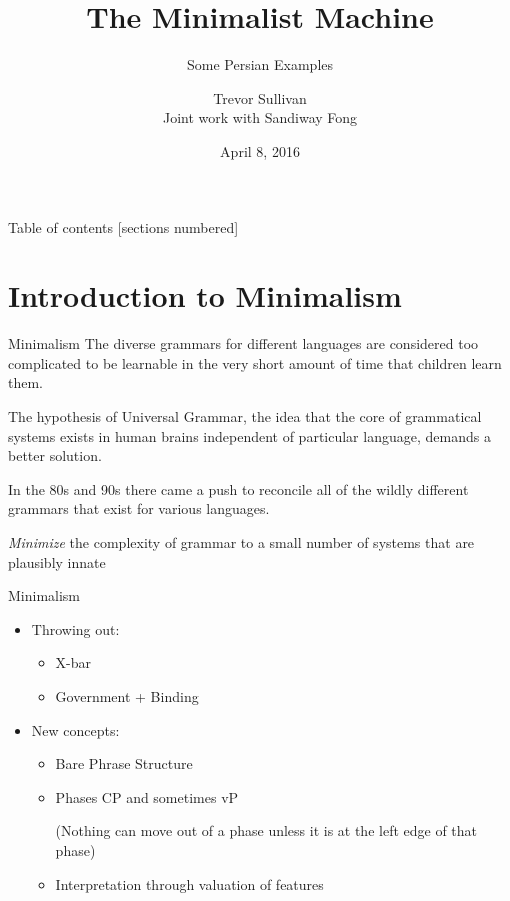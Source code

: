 \documentclass[10pt]{beamer}
\title{The Minimalist Machine}
\subtitle{Some Persian Examples}
\date{April 8, 2016}
\author{Trevor Sullivan \\
Joint work with Sandiway Fong}
\institute{University of Arizona}
\begin{document}
 

\maketitle

\begin{frame}{Table of contents}
  [sections numbered]
  \tableofcontents[hideallsubsections]
\end{frame}

\section{Introduction to Minimalism}


\begin{frame}[fragile]{Minimalism}
  The diverse grammars for different languages are considered too complicated to be learnable in the very short amount of time that children learn them. 

  The hypothesis of Universal Grammar, the idea that the core of grammatical systems exists in human brains independent of particular language, demands a better solution. 

  In the 80s and 90s there came a push to reconcile all of the wildly different grammars that exist for various languages. 

  \emph{Minimize} the complexity of grammar to a small number of systems that are plausibly innate

\end{frame}

\begin{frame}[fragile]{Minimalism}
  \begin{itemize}[<+->]
    \item Throwing out:
    \begin{itemize}[<+->]
      \item X-bar
      \item Government + Binding
    \end{itemize}
    \item New concepts:
    \begin{itemize}[<+->]
      \item Bare Phrase Structure
      \item Phases CP and sometimes vP
      
        (Nothing can move out of a phase unless it is at the left edge of that phase)
      
      \item Interpretation through valuation of features
    \end{itemize}
  \end{itemize}
\end{frame}
\end{document}
